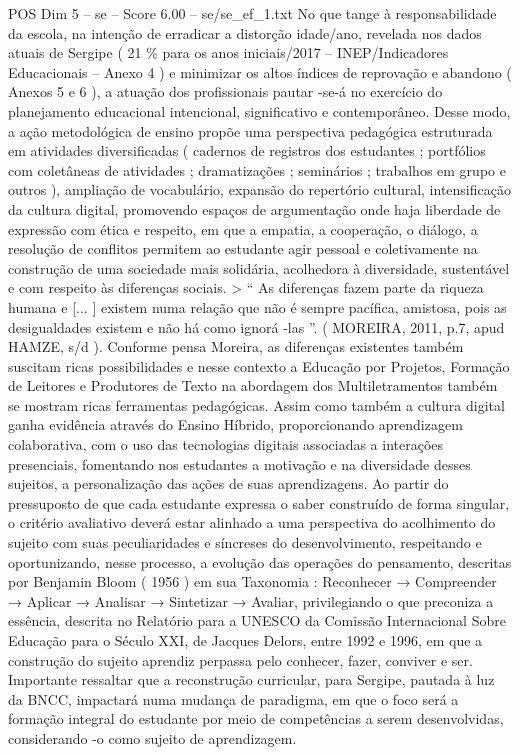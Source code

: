 \begin{textsample}{POS Dim 5 – se – Score 6.00 – se/se\_ef\_1.txt}
No que tange à responsabilidade da escola, na intenção de erradicar a distorção idade/ano, revelada nos dados atuais de Sergipe ( 21 \% para os anos iniciais/2017 – INEP/Indicadores Educacionais – Anexo 4 ) e minimizar os altos índices de reprovação e abandono ( Anexos 5 e 6 ), a atuação dos profissionais pautar -se-á no exercício do planejamento educacional intencional, significativo e contemporâneo.
Desse modo, a ação metodológica de ensino propõe uma perspectiva pedagógica estruturada em atividades diversificadas ( cadernos de registros dos estudantes ; portfólios com coletâneas de atividades ; dramatizações ; seminários ; trabalhos em grupo e outros ), ampliação de vocabulário, expansão do repertório cultural, intensificação da cultura digital, promovendo espaços de argumentação onde haja liberdade de expressão com ética e respeito, em que a empatia, a cooperação, o diálogo, a resolução de conflitos permitem ao estudante agir pessoal e coletivamente na construção de uma sociedade mais solidária, acolhedora à diversidade, sustentável e com respeito às diferenças sociais. > “ As diferenças fazem parte da riqueza humana e [... ] existem numa relação que não é sempre pacífica, amistosa, pois as desigualdades existem e não há como ignorá -las ”. ( MOREIRA, 2011, p.7, apud HAMZE, s/d ).
Conforme pensa Moreira, as diferenças existentes também suscitam ricas possibilidades e nesse contexto a Educação por Projetos, Formação de Leitores e Produtores de Texto na abordagem dos Multiletramentos também se mostram ricas ferramentas pedagógicas.
Assim como também a cultura digital ganha evidência através do Ensino Híbrido, proporcionando aprendizagem colaborativa, com o uso das tecnologias digitais associadas a interações presenciais, fomentando nos estudantes a motivação e na diversidade desses sujeitos, a personalização das ações de suas aprendizagens.
Ao partir do pressuposto de que cada estudante expressa o saber construído de forma singular, o critério avaliativo deverá estar alinhado a uma perspectiva do acolhimento do sujeito com suas peculiaridades e síncreses do desenvolvimento, respeitando e oportunizando, nesse processo, a evolução das operações do pensamento, descritas por Benjamin Bloom ( 1956 ) em sua Taxonomia : Reconhecer → Compreender → Aplicar → Analisar → Sintetizar → Avaliar, privilegiando o que preconiza a essência, descrita no Relatório para a UNESCO da Comissão Internacional Sobre Educação para o Século XXI, de Jacques Delors, entre 1992 e 1996, em que a construção do sujeito aprendiz perpassa pelo conhecer, fazer, conviver e ser.
Importante ressaltar que a reconstrução curricular, para Sergipe, pautada à luz da BNCC, impactará numa mudança de paradigma, em que o foco será a formação integral do estudante por meio de competências a serem desenvolvidas, considerando -o como sujeito de aprendizagem.

\end{textsample}
